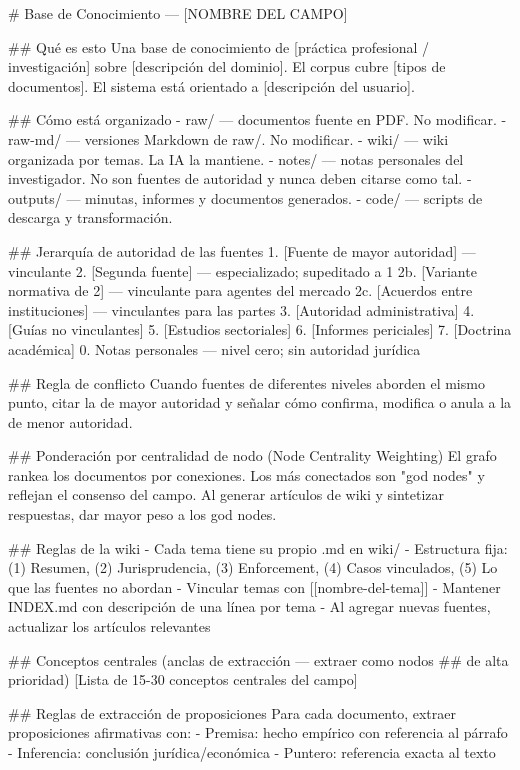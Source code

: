 \documentclass[12pt,a4paper]{article}
\begin{document}
\begin{codebox}
# Base de Conocimiento — [NOMBRE DEL CAMPO]

## Qué es esto
Una base de conocimiento de [práctica profesional / investigación] sobre
[descripción del dominio]. El corpus cubre [tipos de documentos].
El sistema está orientado a [descripción del usuario].

## Cómo está organizado
- raw/         — documentos fuente en PDF. No modificar.
- raw-md/      — versiones Markdown de raw/. No modificar.
- wiki/        — wiki organizada por temas. La IA la mantiene.
- notes/       — notas personales del investigador. No son fuentes
                 de autoridad y nunca deben citarse como tal.
- outputs/     — minutas, informes y documentos generados.
- code/        — scripts de descarga y transformación.

## Jerarquía de autoridad de las fuentes
1. [Fuente de mayor autoridad] — vinculante
2. [Segunda fuente] — especializado; supeditado a 1
   2b. [Variante normativa de 2] — vinculante para agentes del mercado
   2c. [Acuerdos entre instituciones] — vinculantes para las partes
3. [Autoridad administrativa]
4. [Guías no vinculantes]
5. [Estudios sectoriales]
6. [Informes periciales]
7. [Doctrina académica]
0. Notas personales — nivel cero; sin autoridad jurídica

## Regla de conflicto
Cuando fuentes de diferentes niveles aborden el mismo punto, citar
la de mayor autoridad y señalar cómo confirma, modifica o anula
a la de menor autoridad.

## Ponderación por centralidad de nodo (Node Centrality Weighting)
El grafo rankea los documentos por conexiones. Los más conectados
son "god nodes" y reflejan el consenso del campo. Al generar artículos
de wiki y sintetizar respuestas, dar mayor peso a los god nodes.

## Reglas de la wiki
- Cada tema tiene su propio .md en wiki/
- Estructura fija: (1) Resumen, (2) Jurisprudencia, (3) Enforcement,
  (4) Casos vinculados, (5) Lo que las fuentes no abordan
- Vincular temas con [[nombre-del-tema]]
- Mantener INDEX.md con descripción de una línea por tema
- Al agregar nuevas fuentes, actualizar los artículos relevantes

## Conceptos centrales (anclas de extracción — extraer como nodos
## de alta prioridad)
[Lista de 15-30 conceptos centrales del campo]

## Reglas de extracción de proposiciones
Para cada documento, extraer proposiciones afirmativas con:
- Premisa: hecho empírico con referencia al párrafo
- Inferencia: conclusión jurídica/económica
- Puntero: referencia exacta al texto


\end{codebox}
\end{document}
